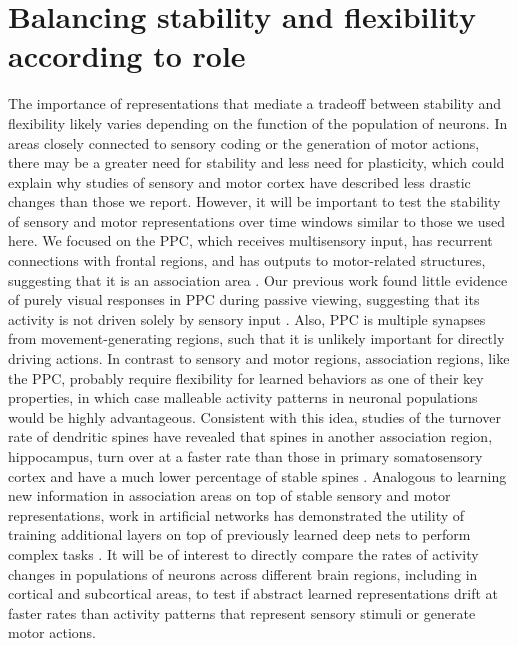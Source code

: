 \section{Balancing stability and flexibility according to role} \label{discussion:stab_vs_flex_by_role}

The importance of representations that mediate a tradeoff between stability and flexibility likely varies depending on the function of the population of neurons. In areas closely connected to sensory coding or the generation of motor actions, there may be a greater need for stability and less need for plasticity, which could explain why studies of sensory and motor cortex have described less drastic changes than those we report. However, it will be important to test the stability of sensory and motor representations over time windows similar to those we used here. We focused on the PPC, which receives multisensory input, has recurrent connections with frontal regions, and has outputs to motor-related structures, suggesting that it is an association area \citep{Harvey:2012du, Oh2014}. Our previous work found little evidence of purely visual responses in PPC during passive viewing, suggesting that its activity is not driven solely by sensory input \citep{Harvey:2012du}. Also, PPC is multiple synapses from movement-generating regions, such that it is unlikely important for directly driving actions. In contrast to sensory and motor regions, association regions, like the PPC, probably require flexibility for learned behaviors as one of their key properties, in which case malleable activity patterns in neuronal populations would be highly advantageous. Consistent with this idea, studies of the turnover rate of dendritic spines have revealed that spines in another association region, hippocampus, turn over at a faster rate than those in primary somatosensory cortex and have a much lower percentage of stable spines \citep{Attardo2015}. Analogous to learning new information in association areas on top of stable sensory and motor representations, work in artificial networks has demonstrated the utility of training additional layers on top of previously learned deep nets to perform complex tasks \citep{Kummerer2014}. It will be of interest to directly compare the rates of activity changes in populations of neurons across different brain regions, including in cortical and subcortical areas, to test if abstract learned representations drift at faster rates than activity patterns that represent sensory stimuli or generate motor actions.

